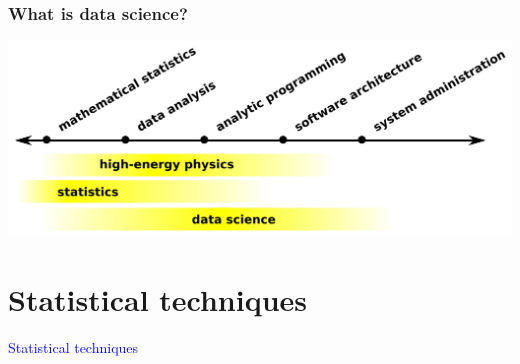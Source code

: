 \documentclass[compress]{beamer}
\begin{document}
\begin{frame}
\frametitle{What is data science?}
\includegraphics[width=\linewidth]{PLOTS/spectrum_of_data_science.png}

\vfill
{}
\end{frame}

\section*{Statistical techniques}
\begin{frame}
\begin{center}
\Huge \textcolor{blue}{Statistical techniques}
\end{center}
\end{frame}
\end{document}
